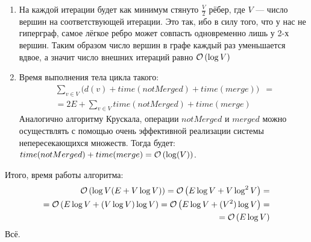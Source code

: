 \begin{enumerate}
	\item На каждой итерации будет как минимум стянуто $\frac{V}{2}$ рёбер, где $V$ --- число вершин на соответствующей
	итерации. Это так, ибо в силу того, что у нас не гиперграф, самое лёгкое ребро может совпасть одновременно лишь у 2-х
	вершин. Таким образом число вершин в графе каждый раз уменьшается вдвое, а значит число внешних итераций 
	равно $\mathcal{O}\left(\log{V}\right)$
	\item Время выполнения тела цикла такого:
	\begin{equation*}
	\begin{split}
		\sum_{v \in V}{\big( d(v) + time(notMerged) + time(merge) \big)} &=\\
		= 2E + \sum_{v \in V}{time(notMerged) + time(merge)}
	\end{split}
	\end{equation*}
	Аналогично алгоритму Крускала, операции $notMerged$ и $merged$ можно осуществлять с помощью очень эффективной реализации
	системы непересекающихся множеств. Тогда будет: $time(notMerged) + time(merge) = \mathcal{O}\left(\log(V)\right)$. 
\end{enumerate} 
Итого, время работы алгоритма:
\begin{equation*}
\begin{split}
	\mathcal{O}\left(\log{V}(E + V\log{V})\right) = \mathcal{O}\left(E\log{V} + V\log^2{V}\right) =\\
	= \mathcal{O}\left(E\log{V} + (V\log{V})\log{V}\right) = \mathcal{O}\left(E\log{V} + (V^2)\log{V}\right) =\\
	= \mathcal{O}\left(E\log{V}\right)
\end{split}
\end{equation*}
Всё. \xqed



